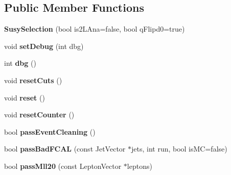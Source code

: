 \subsection*{Public Member Functions}
\begin{DoxyCompactItemize}
\item 
\hypertarget{classSusySelection_a0c0bbc8c7eb7d55c7825ea03e8d2bf0d}{
{\bfseries SusySelection} (bool is2LAna=false, bool qFlipd0=true)}
\label{classSusySelection_a0c0bbc8c7eb7d55c7825ea03e8d2bf0d}

\item 
\hypertarget{classSusySelection_a25d75f7c3c1ed611f41c9aeed4c04e94}{
void {\bfseries setDebug} (int dbg)}
\label{classSusySelection_a25d75f7c3c1ed611f41c9aeed4c04e94}

\item 
\hypertarget{classSusySelection_a7552f682d0145fa5a87c5addc670e357}{
int {\bfseries dbg} ()}
\label{classSusySelection_a7552f682d0145fa5a87c5addc670e357}

\item 
\hypertarget{classSusySelection_a97533b6f715feb06b783474cfc608bd0}{
void {\bfseries resetCuts} ()}
\label{classSusySelection_a97533b6f715feb06b783474cfc608bd0}

\item 
\hypertarget{classSusySelection_ab0ceb5c31c9338c073128354ef1113ce}{
void {\bfseries reset} ()}
\label{classSusySelection_ab0ceb5c31c9338c073128354ef1113ce}

\item 
\hypertarget{classSusySelection_a212c48a8e8a0e0ac7b70b34dff4328b6}{
void {\bfseries resetCounter} ()}
\label{classSusySelection_a212c48a8e8a0e0ac7b70b34dff4328b6}

\item 
\hypertarget{classSusySelection_a71bdb5bdc5ae45eb68a896aecc83fbec}{
bool {\bfseries passEventCleaning} ()}
\label{classSusySelection_a71bdb5bdc5ae45eb68a896aecc83fbec}

\item 
\hypertarget{classSusySelection_a4fd225d1667ac6a4fa81b973c636b8b8}{
bool {\bfseries passBadFCAL} (const JetVector $\ast$jets, int run, bool isMC=false)}
\label{classSusySelection_a4fd225d1667ac6a4fa81b973c636b8b8}

\item 
\hypertarget{classSusySelection_adae424641b1d191b8a74972825a88413}{
bool {\bfseries passMll20} (const LeptonVector $\ast$leptons)}
\label{classSusySelection_adae424641b1d191b8a74972825a88413}


\end{DoxyCompactItemize}
